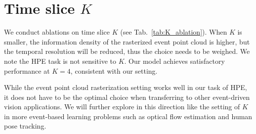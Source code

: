 \documentclass[10pt,twocolumn,letterpaper]{article}
\begin{document}
\section{Time slice $K$}
We conduct ablations on time slice $K$
(see Tab.~\ref{tab:K_ablation}).
When $K$ is smaller, the information density of the rasterized event point cloud is higher, but the temporal resolution will be reduced, thus the choice needs to be weighed. We note the HPE task is not sensitive to $K$. Our model achieves satisfactory performance at $K{=}4$, consistent with our setting.

While the event point cloud rasterization setting works well in our task of HPE, it does not have to be the optimal choice when transferring to other event-driven vision applications. We will further explore in this direction like the setting of $K$ in more event-based learning problems such as optical flow estimation and human pose tracking.

\begin{table}[h]
\renewcommand\thetable{A}
\footnotesize
         \caption{Ablation experiment on $K$.}
\label{tab:K_ablation}
\end{table}
\end{document}
